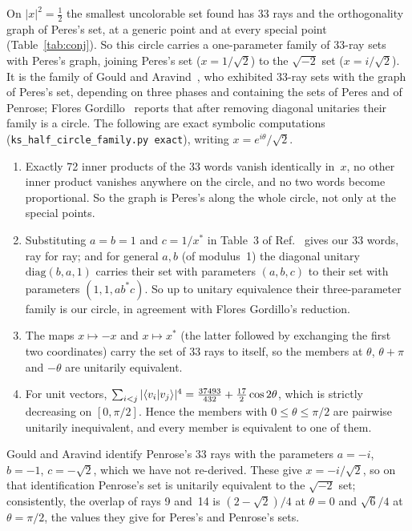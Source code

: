 On $|x|^2=\tfrac12$ the smallest uncolorable set found has 33 rays and the orthogonality graph
of Peres's set, at a generic point and at every special point (Table~\ref{tab:conj}).  So this
circle carries a one-parameter family of 33-ray sets with Peres's graph, joining Peres's set
($x=1/\sqrt2$) to the $\sqrt{-2}$ set ($x=i/\sqrt2$).  It is the family of Gould and
Aravind~\cite{GouldAravind2010}, who exhibited 33-ray sets with the graph of Peres's set,
depending on three phases and containing the sets of Peres and of Penrose; Flores
Gordillo~\cite{FloresGordillo2026} reports that after removing diagonal unitaries their family
is a circle.  The following are exact symbolic computations
(\texttt{ks\_half\_circle\_family.py exact}), writing $x=e^{i\theta}/\sqrt2$.
\begin{enumerate}[label=(\alph*)]
\item Exactly 72 inner products of the 33 words vanish identically in~$x$, no other inner
product vanishes anywhere on the circle, and no two words become proportional.  So the graph is
Peres's along the whole circle, not only at the special points.
\item Substituting $a=b=1$ and $c=1/x^{*}$ in Table~3 of Ref.~\cite{GouldAravind2010} gives our
33 words, ray for ray; and for general $a,b$ (of modulus~1) the diagonal unitary
$\mathrm{diag}(b,a,1)$ carries their set with parameters $(a,b,c)$ to their set with parameters
$(1,1,ab^{*}c)$.  So up to unitary equivalence their three-parameter family is our circle, in
agreement with Flores Gordillo's reduction.
\item The maps $x\mapsto-x$ and $x\mapsto x^{*}$ (the latter followed by exchanging the first
two coordinates) carry the set of 33 rays to itself, so the members at $\theta$, $\theta+\pi$
and $-\theta$ are unitarily equivalent.
\item For unit vectors, $\sum_{i<j}|\langle v_i|v_j\rangle|^4=
\tfrac{37493}{432}+\tfrac{17}{2}\cos2\theta$, which is strictly decreasing on $[0,\pi/2]$.
Hence the members with $0\le\theta\le\pi/2$ are pairwise unitarily inequivalent, and every
member is equivalent to one of them.
\end{enumerate}
Gould and Aravind identify Penrose's 33 rays with the parameters
$a=-i$, $b=-1$, $c=-\sqrt2$, which we have not re-derived.  These give $x=-i/\sqrt2$, so on that
identification Penrose's set is unitarily equivalent to the $\sqrt{-2}$ set; consistently, the
overlap of rays 9 and~14 is $(2-\sqrt2)/4$ at $\theta=0$ and $\sqrt6/4$ at $\theta=\pi/2$, the
values they give for Peres's and Penrose's sets.

